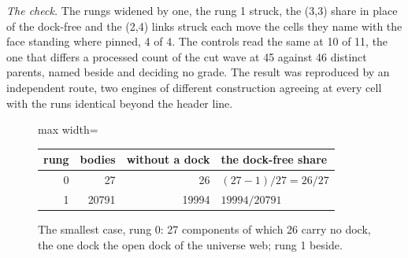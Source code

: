 \begin{chproof}
\textit{The check.} The rungs widened by one, the rung 1 struck, the (3,3) share in place of the dock-free and the (2,4) links struck each move the cells they name with the face standing where pinned, 4 of 4. The controls read the same at 10 of 11, the one that differs a processed count of the cut wave at 45 against 46 distinct parents, named beside and deciding no grade. The result was reproduced by an independent route, two engines of different construction agreeing at every cell with the runs identical beyond the header line.
\end{chproof}
\begin{figure}[h]
\centering
\begin{adjustbox}{max width=\linewidth}\begin{tabular}{rrrl}
\hline
rung & bodies & without a dock & the dock-free share \\
\hline
0 & 27 & 26 & $(27 - 1)/27 = 26/27$ \\
1 & 20791 & 19994 & $19994/20791$ \\
\hline
\end{tabular}\end{adjustbox}
\caption{The smallest case, rung 0: 27 components of which 26 carry no dock, the one dock the open dock of the universe web; rung 1 beside.}
\end{figure}
\par\medskip{}\label{narr:close:10-3}\par
